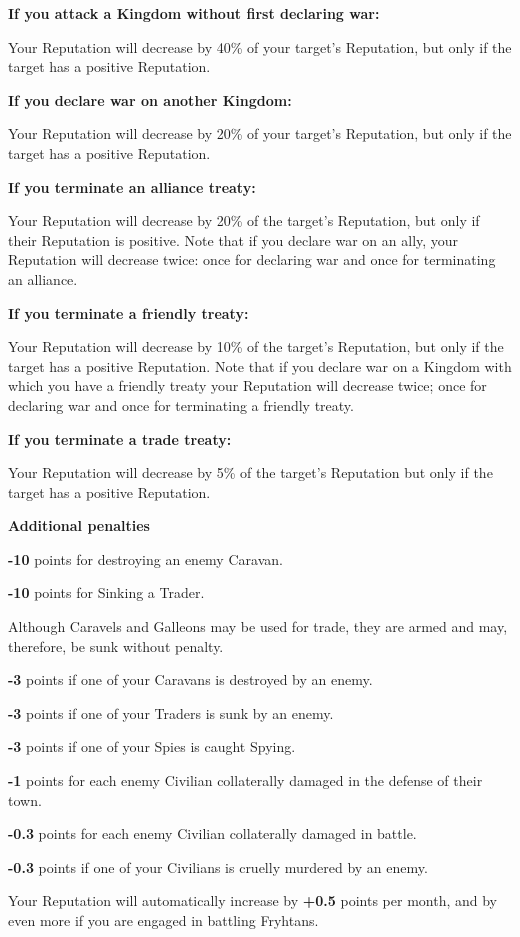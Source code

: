 \begin{changemargin}{.5cm}{0cm}
\textbf{If you attack a Kingdom without first declaring war:}

Your Reputation will decrease by 40\% of your target’s Reputation, but only if the target has a positive Reputation.

\textbf{If you declare war on another Kingdom:}

Your Reputation will decrease by 20\% of your target’s Reputation, but only if the target has a positive Reputation.

\textbf{If you terminate an alliance treaty:}

Your Reputation will decrease by 20\% of the target’s Reputation, but only if their Reputation is positive. Note that if you declare war on an ally, your Reputation will decrease twice: once for declaring war and once for terminating an alliance.

\textbf{If you terminate a friendly treaty:}


Your Reputation will decrease by 10\% of the target’s Reputation, but only if the target has a positive Reputation. Note that if you declare war on a Kingdom with which you have a friendly treaty your Reputation will decrease twice; once for declaring war and once for terminating a friendly treaty.

\textbf{If you terminate a trade treaty:}

Your Reputation will decrease by 5\% of the target’s Reputation but only if the target has a positive Reputation.

\textbf{Additional penalties}

\textbf{-10} points for destroying an enemy Caravan.

\textbf{-10} points for Sinking a Trader.
\end{changemargin}


\begin{changemargin}{1cm}{0cm}
Although Caravels and Galleons may be used for trade, they are armed and may, therefore, be sunk without penalty.
\end{changemargin}

\begin{changemargin}{.5cm}{0cm}
\textbf{-3} points if one of your Caravans is destroyed by an enemy.

\textbf{-3} points if one of your Traders is sunk by an enemy.

\textbf{-3} points if one of your Spies is caught Spying.

\textbf{-1} points for each enemy Civilian collaterally damaged in the defense of their town.

\textbf{-0.3} points for each enemy Civilian collaterally damaged in battle.

\textbf{-0.3} points if one of your Civilians is cruelly murdered by an enemy.

Your Reputation will automatically increase by \textbf{+0.5} points per month, and by even more if you are engaged in battling Fryhtans.
\end{changemargin}

